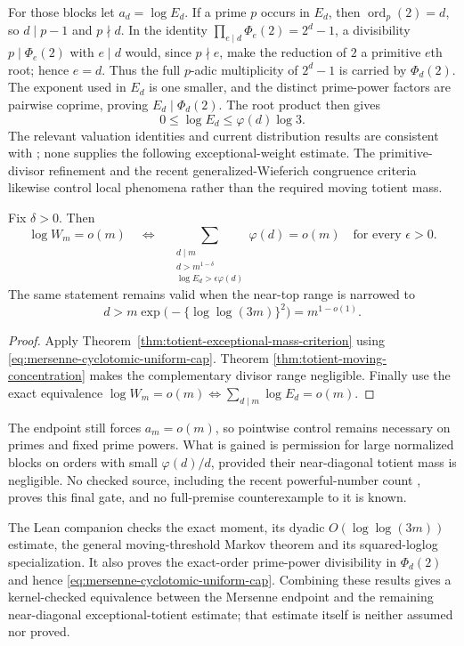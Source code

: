For those blocks let $a_d=\log E_d$.  If a prime $p$ occurs in $E_d$, then
$\operatorname{ord}_p(2)=d$, so $d\mid p-1$ and $p\nmid d$.  In the identity
$\prod_{e\mid d}\Phi_e(2)=2^d-1$, a divisibility
$p\mid\Phi_e(2)$ with $e\mid d$ would, since $p\nmid e$, make the reduction
of $2$ a primitive $e$th root; hence $e=d$.  Thus the full $p$-adic
multiplicity of $2^d-1$ is carried by $\Phi_d(2)$.  The exponent used in
$E_d$ is one smaller, and the distinct prime-power factors are pairwise
coprime, proving $E_d\mid\Phi_d(2)$.  The root product then gives
\begin{equation}\label{eq:mersenne-cyclotomic-uniform-cap}
       0\le\log E_d\le\varphi(d)\log3.
\end{equation}
The relevant valuation identities and current distribution results are
consistent with \cite{MurtySeguin2019,PomeranceCyclotomic2025,
FelliniMurty2026}; none supplies the following exceptional-weight estimate.
The primitive-divisor refinement \cite{GranvillePrimitive2012} and the
recent generalized-Wieferich congruence criteria
\cite{FalkHarringtonJones2026} likewise control local phenomena rather than
the required moving totient mass.

\begin{corollary}
\label{cor:localized-exact-mersenne-gate}
Fix $\delta>0$.  Then
\[
 \log W_m=o(m)
 \quad\Longleftrightarrow\quad
 \sum_{\substack{d\mid m\\d>m^{1-\delta}\\
       \log E_d>\epsilon\varphi(d)}}\varphi(d)=o(m)
 \quad\text{for every }\epsilon>0.
\]
The same statement remains valid when the near-top range is narrowed to
\[
 d>m\exp\bigl(-\{\log\log(3m)\}^2\bigr)=m^{1-o(1)}.
\]
\end{corollary}

\begin{proof}
Apply Theorem~\ref{thm:totient-exceptional-mass-criterion} using
\eqref{eq:mersenne-cyclotomic-uniform-cap}.  Theorem
\ref{thm:totient-moving-concentration} makes the complementary divisor
range negligible.  Finally use the exact equivalence
$\log W_m=o(m)\Longleftrightarrow\sum_{d\mid m}\log E_d=o(m)$.
\end{proof}

The endpoint still forces $a_m=o(m)$, so pointwise control remains necessary
on primes and fixed prime powers.  What is gained is permission for large
normalized blocks on orders with small $\varphi(d)/d$, provided their
near-diagonal totient mass is negligible.  No checked source, including the
recent powerful-number count \cite{BrowningVerzobio2026}, proves this final
gate, and no full-premise counterexample to it is known.

The Lean companion checks the exact moment, its dyadic
$O(\log\log(3m))$ estimate, the general moving-threshold Markov theorem and
its squared-loglog specialization.  It also proves the exact-order
prime-power divisibility in $\Phi_d(2)$ and hence
\eqref{eq:mersenne-cyclotomic-uniform-cap}.  Combining these results gives a
kernel-checked equivalence between the Mersenne endpoint and the remaining
near-diagonal exceptional-totient estimate; that estimate itself is neither
assumed nor proved.
